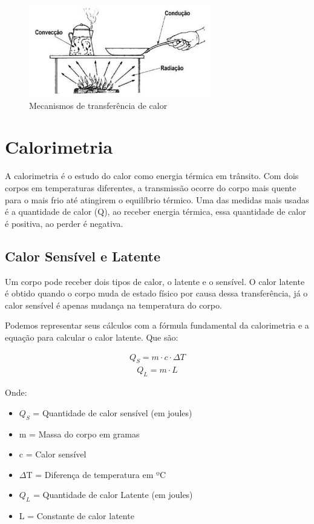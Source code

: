 \begin{figure}[H]
\centering
\includegraphics[width=8cm]{figuras/transferenciadecalor.png}
\caption{Mecanismos de transferência de calor}
\end{figure}

\section{Calorimetria}
A calorimetria é o estudo do calor como energia térmica em trânsito. Com dois corpos em temperaturas diferentes, a transmissão ocorre do corpo mais quente para o mais frio até atingirem o equilíbrio térmico. Uma das medidas mais usadas é a quantidade de calor (Q), ao receber energia térmica, essa quantidade de calor é positiva, ao perder é negativa.

\subsection{Calor Sensível e Latente}
Um corpo pode receber dois tipos de calor, o latente e o sensível. O calor latente é obtido quando o corpo muda de estado físico por causa dessa transferência, já o calor sensível é apenas mudança na temperatura do corpo.

Podemos representar seus cálculos com a fórmula fundamental da calorimetria e a equação para calcular o calor latente. Que são:

\begin{align}
Q_S=m \cdot c \cdot \Delta T
\end{align}
\begin{align}
Q_L=m \cdot L
\end{align}

Onde:
\begin{itemize}
\item $Q_S$ = Quantidade de calor sensível (em joules)
\item m = Massa do corpo em gramas
\item c = Calor sensível
\item $\Delta$T = Diferença de temperatura em ºC
\item $Q_L$ = Quantidade de calor Latente (em joules)
\item L = Constante de calor latente
\end{itemize}

